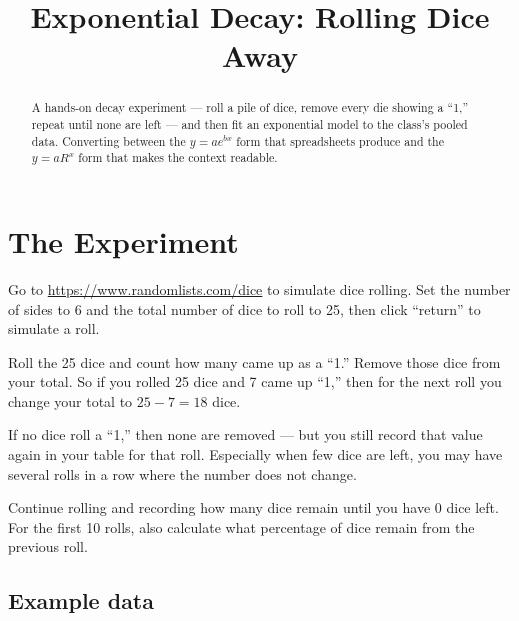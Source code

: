 \documentclass[12pt]{ximera}
\title{Exponential Decay: Rolling Dice Away}
\begin{document}
\begin{abstract}
A hands-on decay experiment --- roll a pile of dice, remove every die showing a ``1,''
repeat until none are left --- and then fit an exponential model to the class's pooled
data. Converting between the $y = a e^{bx}$ form that spreadsheets produce and the
$y = a R^x$ form that makes the context readable.
\end{abstract}
\maketitle

\section*{The Experiment}

Go to \url{https://www.randomlists.com/dice} to simulate dice rolling. Set the number of
sides to 6 and the total number of dice to roll to 25, then click ``return'' to simulate
a roll.

Roll the 25 dice and count how many came up as a ``1.'' Remove those dice from your
total. So if you rolled 25 dice and 7 came up ``1,'' then for the next roll you change
your total to $25 - 7 = 18$ dice.

If no dice roll a ``1,'' then none are removed --- but you still record that value again
in your table for that roll. Especially when few dice are left, you may have several
rolls in a row where the number does not change.

Continue rolling and recording how many dice remain until you have 0 dice left. For the
first 10 rolls, also calculate what percentage of dice remain from the previous roll.

\subsection*{Example data}
\end{document}
